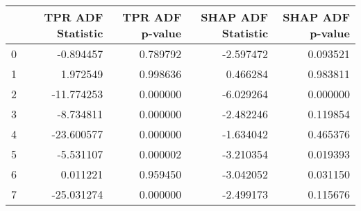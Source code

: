 \begin{tabular}{lrrrr}
\toprule
 & TPR ADF Statistic & TPR ADF p-value & SHAP ADF Statistic & SHAP ADF p-value \\
\midrule
0 & -0.894457 & 0.789792 & -2.597472 & 0.093521 \\
1 & 1.972549 & 0.998636 & 0.466284 & 0.983811 \\
2 & -11.774253 & 0.000000 & -6.029264 & 0.000000 \\
3 & -8.734811 & 0.000000 & -2.482246 & 0.119854 \\
4 & -23.600577 & 0.000000 & -1.634042 & 0.465376 \\
5 & -5.531107 & 0.000002 & -3.210354 & 0.019393 \\
6 & 0.011221 & 0.959450 & -3.042052 & 0.031150 \\
7 & -25.031274 & 0.000000 & -2.499173 & 0.115676 \\
\bottomrule
\end{tabular}
